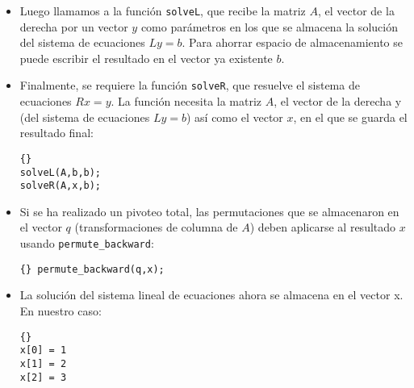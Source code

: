 \documentclass[a4paper,11pt]{article}
\theoremstyle{definition}
\begin{document}
\begin{itemize}
\item Luego llamamos a la función \lstinline{solveL}, que recibe la matriz $A$, 
el vector de la derecha por un vector $y$ como parámetros en los que 
se almacena la solución del sistema de ecuaciones $Ly = b$. 
Para ahorrar espacio de almacenamiento se puede 
escribir el resultado en el vector ya existente $b$.

\item Finalmente, se requiere la función \lstinline{solveR}, que resuelve el 
sistema de ecuaciones $Rx = y$. La función necesita la matriz $A$, el vector de la 
derecha y (del sistema de ecuaciones $Ly = b$) así como el vector $x$, 
en el que se guarda el resultado final:

  {\footnotesize{\begin{lstlisting}{}
solveL(A,b,b);
solveR(A,x,b);
\end{lstlisting}}}

\item Si se ha realizado un pivoteo total, las permutaciones que se almacenaron
 en el vector $q$ (transformaciones de columna de $A$) deben aplicarse al resultado
 $x$ usando \lstinline{permute_backward}:

  {\footnotesize{\begin{lstlisting}{} permute_backward(q,x);
\end{lstlisting}}}

\item La solución del sistema lineal de ecuaciones ahora se almacena en el vector x. 
En nuestro caso:
    {\footnotesize{\begin{lstlisting}{}
x[0] = 1
x[1] = 2
x[2] = 3
\end{lstlisting}}}
  \end{itemize}
\end{document}
